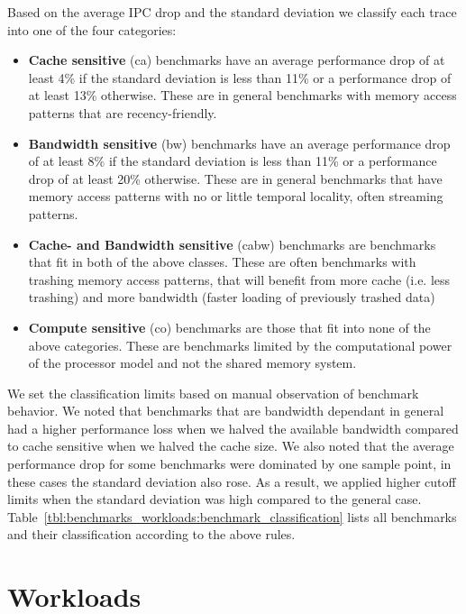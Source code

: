 Based on the average IPC drop and the standard deviation we classify each trace into one of the four categories:
\begin{itemize}

\item \textbf{Cache sensitive} (ca) benchmarks have an average performance drop of at least 4\% if the standard deviation is less than 11\% or a performance drop of at least 13\% otherwise. These are in general benchmarks with memory access patterns that are recency-friendly.

\item \textbf{Bandwidth sensitive} (bw) benchmarks have an average performance drop of at least 8\% if the standard deviation is less than 11\% or a performance drop of at least 20\% otherwise. These are in general benchmarks that have memory access patterns with no or little temporal locality, often streaming patterns.

\item \textbf{Cache- and Bandwidth sensitive} (cabw) benchmarks are benchmarks that fit in both of the above classes. These are often benchmarks with trashing memory access patterns, that will benefit from more cache (i.e. less trashing) and more bandwidth (faster loading of previously trashed data)

\item \textbf{Compute sensitive} (co) benchmarks are those that fit into none of the above categories. These are benchmarks limited by the computational power of the processor model and not the shared memory system.

\end{itemize}

We set the classification limits based on manual observation of benchmark behavior. 
We noted that benchmarks that are bandwidth dependant in general had a higher performance loss when we halved the available bandwidth compared to cache sensitive when we halved the cache size.
We also noted that the average performance drop for some benchmarks were dominated by one sample point, in these cases the standard deviation also rose. 
As a result, we applied higher cutoff limits when the standard deviation was high compared to the general case.
Table~\ref{tbl:benchmarks_workloads:benchmark_classification} lists all benchmarks and their classification according to the above rules.


\section{Workloads}

